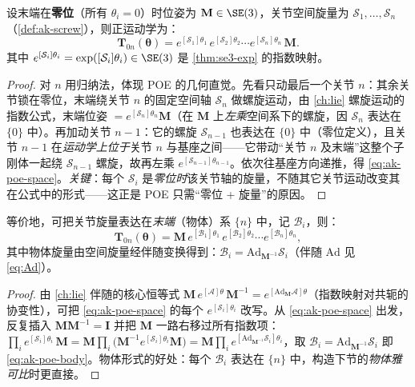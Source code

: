 \begin{theorem}[空间形式的旋量积 FK]\label{thm:ak-poe-space}
设末端在\textbf{零位}（所有 $\theta_i=0$）时位姿为 $\mathbf{M}\in\SE(3)$，关节空间旋量为 $\mathcal{S}_1,\dots,\mathcal{S}_n$（\cref{def:ak-screw}），则正运动学为\cite{lynch2017modern}：
\begin{equation}
  \boxed{\mathbf{T}_{0n}(\boldsymbol{\theta})=e^{[\mathcal{S}_1]\theta_1}\,e^{[\mathcal{S}_2]\theta_2}\cdots e^{[\mathcal{S}_n]\theta_n}\,\mathbf{M}.}
  \label{eq:ak-poe-space}
\end{equation}
其中 $e^{[\mathcal{S}_i]\theta_i}=\exp([\mathcal{S}_i]\theta_i)\in\SE(3)$ 是 \cref{thm:se3-exp} 的指数映射。
\end{theorem}
\begin{proof}
对 $n$ 用归纳法，体现 POE 的几何直觉\cite{lynch2017modern}。先看只动最后一个关节 $n$：其余关节锁在零位，末端绕关节 $n$ 的固定空间轴 $\mathcal{S}_n$ 做螺旋运动，由 \cref{ch:lie} 螺旋运动的指数公式，末端位姿 $=e^{[\mathcal{S}_n]\theta_n}\mathbf{M}$（在 $\mathbf{M}$ 上\emph{左乘}空间系下的螺旋，因 $\mathcal{S}_n$ 表达在 $\{0\}$ 中）。再加动关节 $n-1$：它的螺旋 $\mathcal{S}_{n-1}$ 也表达在 $\{0\}$ 中（零位定义），且关节 $n-1$ 在\emph{运动学上位于}关节 $n$ 与基座之间——它带动“关节 $n$ 及末端”这整个子刚体一起绕 $\mathcal{S}_{n-1}$ 螺旋，故再左乘 $e^{[\mathcal{S}_{n-1}]\theta_{n-1}}$。依次往基座方向递推，得 \cref{eq:ak-poe-space}。\emph{关键}：每个 $\mathcal{S}_i$ 是\emph{零位时}该关节轴的旋量，不随其它关节运动改变其在公式中的形式——这正是 POE 只需“零位 + 旋量”的原因。
\end{proof}

\begin{theorem}[物体形式的旋量积 FK]\label{thm:ak-poe-body}
等价地，可把关节旋量表达在\emph{末端}（物体）系 $\{n\}$ 中，记 $\mathcal{B}_i$，则\cite{lynch2017modern}：
\begin{equation}
  \mathbf{T}_{0n}(\boldsymbol{\theta})=\mathbf{M}\,e^{[\mathcal{B}_1]\theta_1}\,e^{[\mathcal{B}_2]\theta_2}\cdots e^{[\mathcal{B}_n]\theta_n},
  \label{eq:ak-poe-body}
\end{equation}
其中物体旋量由空间旋量经伴随变换得到：$\mathcal{B}_i=\mathrm{Ad}_{\mathbf{M}^{-1}}\mathcal{S}_i$（伴随 $\mathrm{Ad}$ 见 \cref{eq:Ad}）。
\end{theorem}
\begin{proof}
由 \cref{ch:lie} 伴随的核心恒等式 $\mathbf{M}\,e^{[\mathcal{A}]\theta}\,\mathbf{M}^{-1}=e^{[\mathrm{Ad}_{\mathbf{M}}\mathcal{A}]\theta}$（指数映射对共轭的协变性），可把 \cref{eq:ak-poe-space} 的每个 $e^{[\mathcal{S}_i]\theta_i}$ 改写。从 \cref{eq:ak-poe-space} 出发，反复插入 $\mathbf{M}\mathbf{M}^{-1}=\mathbf{I}$ 并把 $\mathbf{M}$ 一路右移过所有指数项：$\prod_i e^{[\mathcal{S}_i]\theta_i}\,\mathbf{M}=\mathbf{M}\prod_i\big(\mathbf{M}^{-1}e^{[\mathcal{S}_i]\theta_i}\mathbf{M}\big)=\mathbf{M}\prod_i e^{[\mathrm{Ad}_{\mathbf{M}^{-1}}\mathcal{S}_i]\theta_i}$，取 $\mathcal{B}_i=\mathrm{Ad}_{\mathbf{M}^{-1}}\mathcal{S}_i$ 即 \cref{eq:ak-poe-body}。物体形式的好处：每个 $\mathcal{B}_i$ 表达在 $\{n\}$ 中，构造下节的\emph{物体雅可比}时更直接。
\end{proof}

